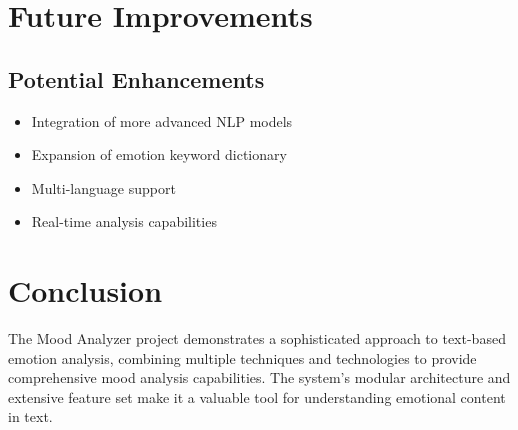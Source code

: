 \documentclass[12pt]{article}
\begin{document}
\section{Future Improvements}
\subsection{Potential Enhancements}
\begin{itemize}
    \item Integration of more advanced NLP models
    \item Expansion of emotion keyword dictionary
    \item Multi-language support
    \item Real-time analysis capabilities
\end{itemize}

\section{Conclusion}
The Mood Analyzer project demonstrates a sophisticated approach to text-based emotion analysis, combining multiple techniques and technologies to provide comprehensive mood analysis capabilities. The system's modular architecture and extensive feature set make it a valuable tool for understanding emotional content in text.
\end{document}

